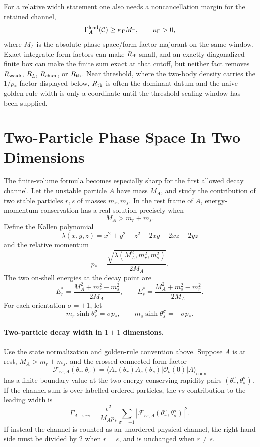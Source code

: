 \begin{remark}
\begin{equation}
  \label{eq:nonintegrable-decay-rate-residual-bound}
\end{equation}
For a relative width statement one also needs a noncancellation margin for the
retained channel,
\[
  \Gamma_A^{\rm lead}(\mathcal C)\ge\kappa_\Gamma M_\Gamma,\qquad
  \kappa_\Gamma>0,
\]
where \(M_\Gamma\) is the absolute phase-space/form-factor majorant on the
same window.  Exact integrable form factors can make \(R_{\rm ff}\) small, and
an exactly diagonalized finite box can make the finite sum exact at that
cutoff, but neither fact removes \(R_{\rm weak}\), \(R_L\), \(R_{\rm chan}\),
or \(R_{\rm th}\).  Near threshold, where the two-body density carries the
\(1/p_*\) factor displayed below, \(R_{\rm th}\) is often the dominant datum
and the naive golden-rule width is only a coordinate until the threshold
scaling window has been supplied.
\end{remark}

\section{Two-Particle Phase Space In Two Dimensions}

The finite-volume formula becomes especially sharp for the first allowed
decay channel.  Let the unstable particle \(A\) have mass \(M_A\), and study
the contribution of two stable particles \(r,s\) of masses \(m_r,m_s\).  In
the rest frame of \(A\), energy-momentum conservation has a real solution
precisely when
\[
  M_A>m_r+m_s .
\]
Define the Kallen polynomial
\[
  \lambda(x,y,z)=x^2+y^2+z^2-2xy-2xz-2yz
\]
and the relative momentum
\[
  p_*=
  \frac{\sqrt{\lambda(M_A^2,m_r^2,m_s^2)}}{2M_A}.
\]
The two on-shell energies at the decay point are
\[
  E_r^*=\frac{M_A^2+m_r^2-m_s^2}{2M_A},
  \qquad
  E_s^*=\frac{M_A^2+m_s^2-m_r^2}{2M_A}.
\]
For each orientation \(\sigma=\pm1\), let
\[
  m_r\sinh\theta_r^\sigma=\sigma p_*,
  \qquad
  m_s\sinh\theta_s^\sigma=-\sigma p_* .
\]

\paragraph{Two-particle decay width in \(1+1\) dimensions.}
Use the state normalization and golden-rule convention above.  Suppose \(A\)
is at rest, \(M_A>m_r+m_s\), and the crossed connected form factor
\[
  \mathcal F_{rs;A}(\theta_r,\theta_s)
  =
  \langle A_r(\theta_r)A_s(\theta_s)|
  \mathcal O_b(0)|A\rangle_{\mathrm{conn}}
\]
has a finite boundary value at the two energy-conserving rapidity pairs
\((\theta_r^\sigma,\theta_s^\sigma)\).  If the channel sum is over labelled
ordered particles, the \(rs\) contribution to the leading width is
\[
  \Gamma_{A\to rs}
  =
  \frac{\epsilon^2}{M_Ap_*}
  \sum_{\sigma=\pm1}
  \left|
    \mathcal F_{rs;A}(\theta_r^\sigma,\theta_s^\sigma)
  \right|^2 .
\]
If instead the channel is counted as an unordered physical channel, the
right-hand side must be divided by \(2\) when \(r=s\), and is unchanged when
\(r\ne s\).

